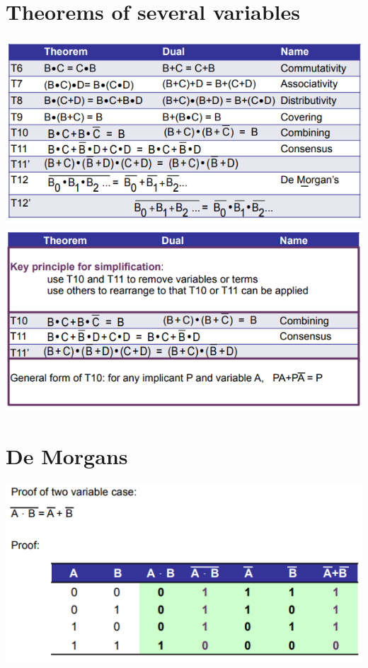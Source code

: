 \documentclass{article}[18pt]
\begin{document}
\section{Theorems of several variables}
\includegraphics[scale=0.7]{SeveralVar.png}\\
\includegraphics[scale=0.7]{SeveralVar2.png}
\section{De Morgans}
\includegraphics[scale=0.7]{DeMorgan.png}
\end{document}
